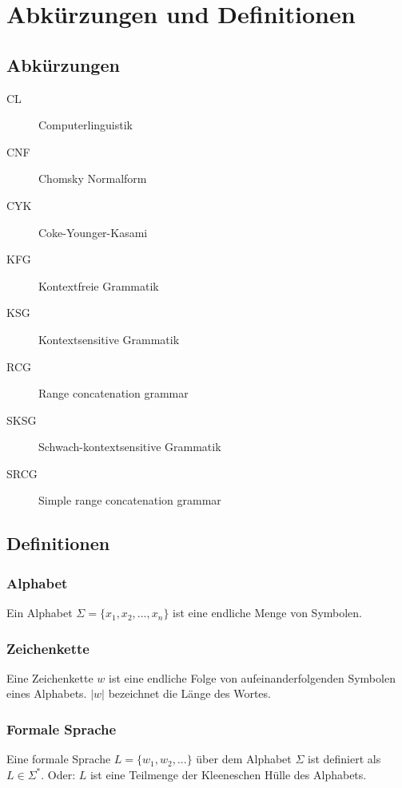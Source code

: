 \documentclass[12pt,a4paper]{article}
\theoremstyle{definition}
\begin{document}
\newpage

\appendix

\section{Abkürzungen und Definitionen}

	\subsection{Abkürzungen}
		
		\begin{description}
			\item[CL] Computerlinguistik
			\item[CNF] Chomsky Normalform
			\item[CYK] Coke-Younger-Kasami
			\item[KFG] Kontextfreie Grammatik
			\item[KSG] Kontextsensitive Grammatik
			\item[RCG] Range concatenation grammar
			\item[SKSG] Schwach-kontextsensitive Grammatik
			\item[SRCG] Simple range concatenation grammar
		\end{description}
	
	\subsection{Definitionen}
		\subsubsection{Alphabet}
			Ein Alphabet $\Sigma=\{x_1, x_2, ..., x_n\}$ ist eine endliche Menge von Symbolen.
	
		\subsubsection{Zeichenkette}
			Eine Zeichenkette $w$ ist eine endliche Folge von aufeinanderfolgenden Symbolen eines Alphabets. $|w|$ bezeichnet die Länge des Wortes.
		
		\subsubsection{Formale Sprache}
			Eine formale Sprache $L=\{w_1, w_2, ...\}$ über dem Alphabet $\Sigma$ ist definiert als $L \in \Sigma^*$. Oder: $L$ ist eine Teilmenge der Kleeneschen Hülle des Alphabets.
		
\end{document}
